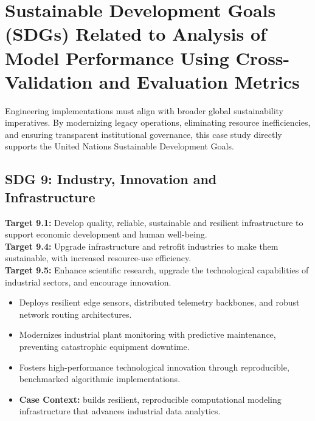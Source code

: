 \section{Sustainable Development Goals (SDGs) Related to Analysis of Model Performance Using Cross-Validation and Evaluation Metrics}
Engineering implementations must align with broader global sustainability imperatives. By modernizing legacy operations, eliminating resource inefficiencies, and ensuring transparent institutional governance, this case study directly supports the United Nations Sustainable Development Goals.

\subsection{SDG 9: Industry, Innovation and Infrastructure}
\noindent\textbf{Target 9.1:} Develop quality, reliable, sustainable and resilient infrastructure to support economic development and human well-being. \\
\noindent\textbf{Target 9.4:} Upgrade infrastructure and retrofit industries to make them sustainable, with increased resource-use efficiency. \\
\noindent\textbf{Target 9.5:} Enhance scientific research, upgrade the technological capabilities of industrial sectors, and encourage innovation.
\begin{itemize}
  \item Deploys resilient edge sensors, distributed telemetry backbones, and robust network routing architectures.
  \item Modernizes industrial plant monitoring with predictive maintenance, preventing catastrophic equipment downtime.
  \item Fosters high-performance technological innovation through reproducible, benchmarked algorithmic implementations.
  \item \textbf{Case Context:} builds resilient, reproducible computational modeling infrastructure that advances industrial data analytics.
\end{itemize}
